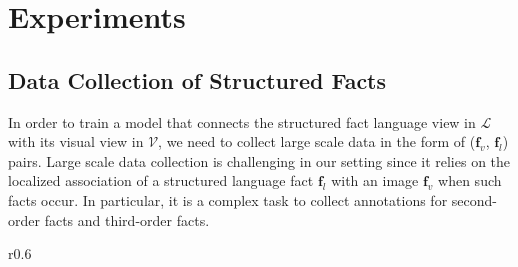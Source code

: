 \documentclass[runningheads]{llncs}
\begin{document}
\section{Experiments}
\label{sec_exp}
\vspace{-2mm}\subsection{Data Collection of Structured Facts}\vspace{-2mm}\label{sec_data}
In order to train a
model that connects the structured fact language view in $\mathcal{L}$ with its visual view in $\mathcal{V}$,  we need to collect large scale data in the form of ($\mathbf{f}_v$, $\mathbf{f}_l$) pairs. Large scale data collection is  challenging in our setting since it  relies on the localized association of a structured language fact $\mathbf{f}_l$ with an image $\mathbf{f}_v$ when such facts occur. In particular, it is a complex task to collect annotations for second-order facts and third-order facts.  %
\begin{wraptable}{r}{0.6\textwidth} \vspace{-9mm}
  \centering
  \caption{Coverage of facts in the Large Scale Setting}
  \vspace{-3mm}
    \label{tab_lsc_setting}%
    \vspace{-3mm}
\end{wraptable}
\end{document}
